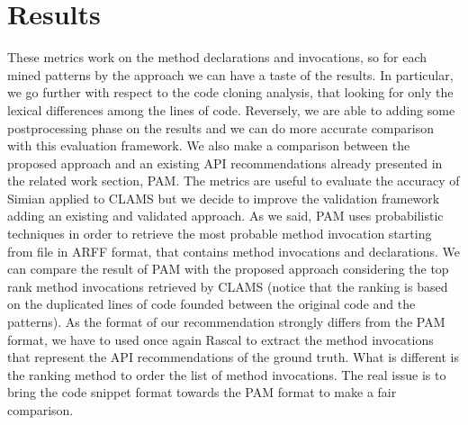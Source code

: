 \section{Results}

These metrics work on the method declarations and invocations, so for each mined patterns by the approach we can have a taste of the results. In particular, we go further with respect to the code cloning analysis, that looking for only the lexical differences among the lines of code. Reversely, we are able to adding some postprocessing phase on the results and we can do more accurate comparison with this evaluation framework. 
We also make a comparison between the proposed approach and an existing API recommendations already presented in the related work section, PAM. The metrics are useful to evaluate the accuracy of Simian applied to CLAMS but we decide to improve the validation framework adding an existing and validated approach. As we said, PAM uses probabilistic techniques in order to retrieve the most probable method invocation starting from file in ARFF format, that contains method invocations and declarations. We can compare the result of PAM with the proposed approach considering the top rank method invocations retrieved by CLAMS (notice that the ranking is based on the duplicated lines of code founded between the original code and the patterns). As the format of our recommendation strongly differs from the PAM format, we have to used once again Rascal to extract the method invocations that represent the API recommendations of the ground truth. What is different is the ranking method to order the list of method invocations. The real issue is to bring the code snippet format towards the PAM format to make a fair comparison.\\
